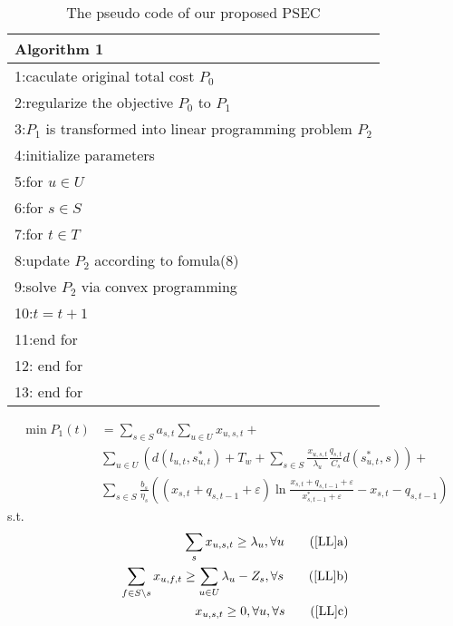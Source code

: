 \documentclass[journal,article,submit,pdftex,moreauthors]{Definitions/mdpi}
\begin{document}
\begin{table}[h] %
 \footnotesize
\caption{The pseudo code of our proposed PSEC} %
\begin{tabular}{p{8cm}} %

\hline
\textbf{Algorithm 1}  \\ %


\hline %
1:caculate original total cost $P_0$\\
2:regularize the objective $P_0$ to $P_1$\\
3:$P_1$ is transformed into linear programming problem $P_2$\\
4:initialize parameters \\
5:for $u \in U$\\
6:\quad for $s\in S$\\
7:\quad \quad for $t\in T$\\
8:\quad \quad update $P_2$ according to fomula(8)\\
9:\quad \quad solve $P_2$ via convex programming\\
10:\quad \quad $t=t+1$\\
11:\quad \quad end for\\
12: \quad end for\\
13: end for\\
\hline
\end{tabular}
\end{table}



 \begin{equation}
\begin{aligned}
\min P_1(t)&=\sum_{s\in S}a_{s,t}\sum_{u\in U}x_{u,s,t}+\\
&\sum_{u\in U}(d(l_{u,t},s_{u,t}^{*})+T_w+\sum_{s\in S}\frac{x_{u,s,t}}{\lambda_u}\frac{q_{s,t}}{C_s}d(s_{u,t}^{*},s))+\\
&\sum_{s\in S}\frac{b_s}{\eta_s}((x_{s,t}+q_{s,t-1}+\varepsilon)\ln \frac{x_{s,t}+q_{s,t-1}+\varepsilon }{x_{s,t-1}^{*}+\varepsilon }-x_{s,t}-q_{s,t-1})\label{LL} 
\end{aligned}
 \end{equation}
 s.t.
 \begin{align}
\sum_s x_{u,s,t} \ge \lambda_u, \forall u  \tag{\ref{LL}{a}} \label{LLa}\\
\sum_{f\in S \backslash s} x_{u,f,t} \ge \sum_{u\in U}\lambda_u-Z_s, \forall s \tag{\ref{LL}{b}}\\ x_{u,s,t} \ge 0, \forall u, \forall s \tag{\ref{LL}{c}} \label{LLc}
\end{align}
\end{document}
